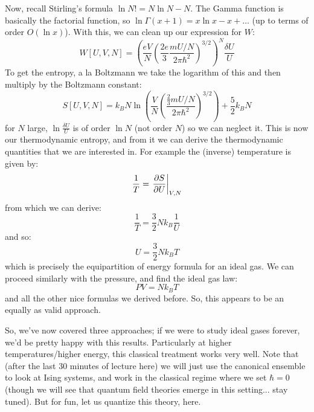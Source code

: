 Now, recall Stirling's formula $\ln N! = N\ln N - N$. The Gamma function is basically the factorial function, so $\ln \Gamma(x + 1) = x\ln x - x + \ldots$ (up to terms of order $O(\ln x)$). With this, we can clean up our expression for $W$:
\begin{equation}
    W[U, V, N] = \left(\frac{eV}{N}\left(\frac{2e}{3}\frac{mU/N}{2\pi \hbar^2}\right)^{3/2}\right)^{N}\frac{\delta U}{U}
\end{equation}
To get the entropy, a la Boltzmann we take the logarithm of this and then multiply by the Boltzmann constant:
\begin{equation}
    S[U, V, N] = k_B N\ln\left(\frac{V}{N}\left(\frac{\frac{2}{3}mU/N}{2\pi\hbar^2}\right)^{3/2}\right) + \frac{5}{2}k_B N
\end{equation}
for $N$ large, $\ln\frac{\delta U}{U}$ is of order $\ln N$ (not order $N$) so we can neglect it. This is now our thermodynamic entropy, and from it we can derive the thermodynamic quantities that we are interested in. For example the (inverse) temperature is given by:
\begin{equation}
    \frac{1}{T} = \left. \frac{\partial S}{\partial U}\right|_{V, N}
\end{equation}
from which we can derive:
\begin{equation}
    \frac{1}{T} = \frac{3}{2}Nk_B \frac{1}{U}
\end{equation}
and so:
\begin{equation}
    U = \frac{3}{2}Nk_B T
\end{equation}
which is precisely the equipartition of energy formula for an ideal gas. We can proceed similarly with the pressure, and find the ideal gas law:
\begin{equation}
    PV = Nk_B T
\end{equation}
and all the other nice formulas we derived before. So, this appears to be an equally as valid approach.

So, we've now covered three approaches; if we were to study ideal gases forever, we'd be pretty happy with this results. Particularly at higher temperatures/higher energy, this classical treatment works very well. Note that (after the last 30 minutes of lecture here) we will just use the canonical ensemble to look at Ising systems, and work in the classical regime where we set $\hbar = 0$ (though we will see that quantum field theories emerge in this setting... stay tuned). But for fun, let us quantize this theory, here.

